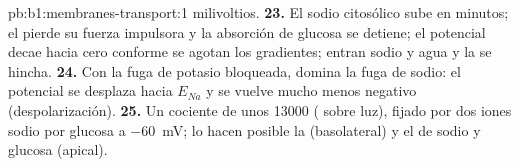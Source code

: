 \begin{solution}{pb:b1:membranes-transport:1}
milivoltios.
\textbf{23.} El sodio citosólico sube en minutos; el  pierde su
fuerza impulsora y la absorción de glucosa se detiene; el potencial decae
hacia cero conforme se agotan los gradientes; entran sodio y agua y la
 se hincha.
\textbf{24.} Con la fuga de potasio bloqueada, domina la fuga de sodio: el
potencial se desplaza hacia $E_{Na}$ y se vuelve mucho menos negativo
(despolarización).
\textbf{25.} Un cociente de unos \num{13000} ( sobre luz), fijado por
dos iones sodio por glucosa a \qty{-60}{mV}; lo hacen posible la  (basolateral) y el  de sodio y glucosa (apical).
\end{solution}
